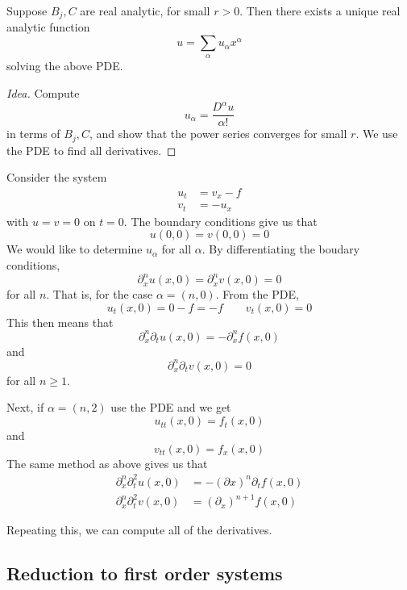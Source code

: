 \documentclass{article}
\begin{document}
\begin{theorem}
    Suppose \(B_j, C\) are real analytic, for small \(r > 0\). Then there exists a unique real analytic function
    \[u = \sum_\alpha u_\alpha x^\alpha\]
    solving the above PDE.
\end{theorem}

\begin{proof}
    [Idea] Compute
    \[u_\alpha = \frac{D^\alpha u}{\alpha!}\]
    in terms of \(B_j, C\), and show that the power series converges for small \(r\). We use the PDE to find all derivatives.
\end{proof}

\begin{example}
    Consider the system
    \begin{align*}
        u_t &= v_x - f \\
        v_t &= -u_x
    \end{align*}
    with \(u = v = 0\) on \(t = 0\). The boundary conditions give us that
    \[u(0, 0) = v(0, 0) = 0\]
    We would like to determine \(u_\alpha\) for all \(\alpha\). By differentiating the boudary conditions,
    \[\partial_x^nu(x, 0) = \partial_x^nv(x, 0) = 0\]
    for all \(n\). That is, for the case \(\alpha = (n, 0)\). From the PDE,
    \[u_t(x, 0) = 0 - f = -f \qquad v_t(x, 0) = 0\]
    This then means that
    \[\partial_x^n \partial_t u(x, 0) = -\partial_x^n f(x, 0)\]
    and
    \[\partial_x^n \partial_tv(x, 0) = 0\]
    for all \(n \ge 1\).
    
    Next, if \(\alpha = (n, 2)\) use the PDE and we get
    \[u_{tt}(x, 0) = f_t(x, 0)\]
    and
    \[v_{tt}(x, 0) = f_x(x, 0)\]
    The same method as above gives us that
    \begin{align*}
        \partial_x^n\partial_t^2 u(x, 0) &= -(\partial x)^n \partial_t f(x, 0) \\
        \partial_x^n\partial_t^2 v(x, 0) &= (\partial_x)^{n+1}f(x, 0)
    \end{align*}

    Repeating this, we can compute all of the derivatives.
\end{example}

\lec

\subsection{Reduction to first order systems}
\end{document}
